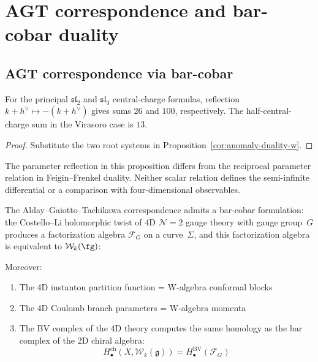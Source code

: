 \section{AGT correspondence and bar-cobar duality}
\label{sec:mathematical-bridges}



\subsection{AGT correspondence via bar-cobar}

\begin{proposition}
\label{thm:agt-2d-bar}
For the principal $\mathfrak{sl}_2$ and $\mathfrak{sl}_3$ central-charge formulas, reflection $k+h^\vee\mapsto-(k+h^\vee)$ gives sums $26$ and $100$, respectively.
The half-central-charge sum in the Virasoro case is $13$.
\end{proposition}

\begin{proof}
Substitute the two root systems in Proposition~\ref{cor:anomaly-duality-w}.
\end{proof}

The parameter reflection in this proposition differs from the reciprocal parameter relation in Feigin--Frenkel duality.
Neither scalar relation defines the semi-infinite differential or a comparison with four-dimensional observables.

\begin{conjecture}\label{conj:agt-bar-cobar}
The Alday--Gaiotto--Tachikawa correspondence \cite{AGT09} admits a
bar-cobar formulation: the Costello--Li holomorphic twist of 4D
$\mathcal{N}=2$ gauge theory with gauge group~$G$ produces a
factorization algebra $\mathcal{F}_G$ on a curve~$\Sigma$, and
this factorization algebra is equivalent to $\mathcal{W}_k(\fg)$:

\begin{center}
\end{center}

Moreover:
\begin{enumerate}
\item The 4D instanton partition function = W-algebra conformal blocks
\item The 4D Coulomb branch parameters = W-algebra momenta
\item The BV complex of the 4D theory computes the same homology as
  the bar complex of the 2D chiral algebra:
      \[H_\bullet^{\text{ch}}(X, \mathcal{W}_k(\mathfrak{g})) = H_\bullet^{\text{BV}}(\mathcal{F}_G)\]
\end{enumerate}
\end{conjecture}

